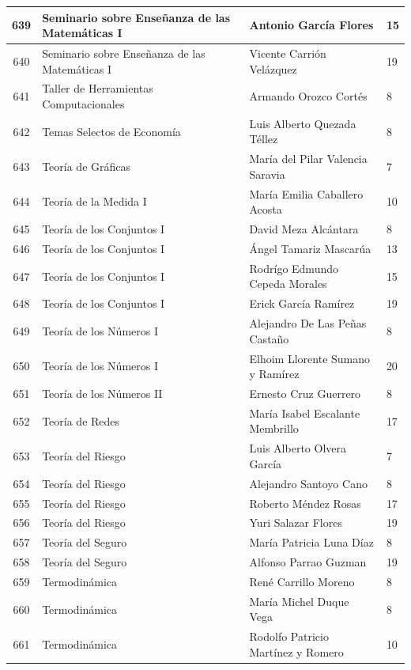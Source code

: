 {\begin{longtable}{|c|p{6.5cm}|p{5cm}|p{1.5cm}|}
  639 & Seminario sobre Enseñanza de las Matemáticas I & Antonio García Flores & 15 \\ \hline
  640 & Seminario sobre Enseñanza de las Matemáticas I & Vicente Carrión Velázquez & 19 \\ \hline
  641 & Taller de Herramientas Computacionales & Armando Orozco Cortés & 8 \\ \hline
  642 & Temas Selectos de Economía & Luis Alberto Quezada Téllez & 8 \\ \hline
  643 & Teoría de Gráficas & María del Pilar Valencia Saravia & 7 \\ \hline
  644 & Teoría de la Medida I & María Emilia Caballero Acosta & 10 \\ \hline
  645 & Teoría de los Conjuntos I & David Meza Alcántara & 8 \\ \hline
  646 & Teoría de los Conjuntos I & Ángel Tamariz Mascarúa & 13 \\ \hline
  647 & Teoría de los Conjuntos I & Rodrígo Edmundo Cepeda Morales & 15 \\ \hline
  648 & Teoría de los Conjuntos I & Erick García Ramírez & 19 \\ \hline
  649 & Teoría de los Números I & Alejandro De Las Peñas Castaño & 8 \\ \hline
  650 & Teoría de los Números I & Elhoim Llorente Sumano y Ramírez & 20 \\ \hline
  651 & Teoría de los Números II & Ernesto Cruz Guerrero & 8 \\ \hline
  652 & Teoría de Redes & María Isabel Escalante Membrillo & 17 \\ \hline
  653 & Teoría del Riesgo & Luis Alberto Olvera García & 7 \\ \hline
  654 & Teoría del Riesgo & Alejandro Santoyo Cano & 8 \\ \hline
  655 & Teoría del Riesgo & Roberto Méndez Rosas & 17 \\ \hline
  656 & Teoría del Riesgo & Yuri Salazar Flores & 19 \\ \hline
  657 & Teoría del Seguro & María Patricia Luna Díaz & 8 \\ \hline
  658 & Teoría del Seguro & Alfonso Parrao Guzman & 19 \\ \hline
  659 & Termodinámica & René Carrillo Moreno & 8 \\ \hline
  660 & Termodinámica & María Michel Duque Vega & 8 \\ \hline
  661 & Termodinámica & Rodolfo Patricio Martínez y Romero & 10 \\ \hline

\end{longtable}}
